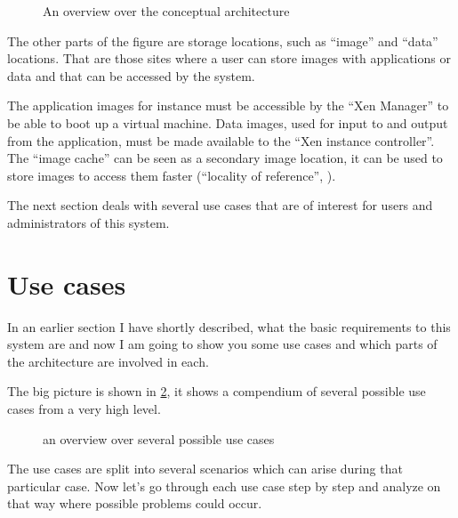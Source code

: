 \begin{figure}[htbp]
  \begin{center}
  \end{center}
  \caption[Architecture overview]{An overview over the conceptual
    architecture}
  \label{fig:architecture}
\end{figure}

The other parts of the figure are storage locations, such as ``image'' and
``data'' locations.   That are those sites  where a user  can store images
with applications  or data  and that  can be accessed  by the  system.

The  application images  for  instance  must be  accessible  by the  ``Xen
Manager'' to be able to boot  up a virtual machine.  Data images, used for
input to  and output from the  application, must be made  available to the
``Xen  instance  controller''.  The  ``image  cache''  can  be seen  as  a
secondary image  location, it can be  used to store images  to access them
faster (``locality of reference'', \cite{locality-principle}).

The next  section deals with  several use cases  that are of  interest for
users and administrators of this system.

\section{Use cases}

In  an  earlier   section  I  have  shortly  described,   what  the  basic
requirements to this  system are and now  I am going to show  you some use
cases and which parts of the architecture are involved in each.

The  big  picture  is  shown  in  \ref{fig:system-usecases},  it  shows  a
compendium of several possible use cases from a very high level.

\begin{figure}[htbp]
  \begin{center}
  \end{center}
  \caption[Use case overview]{an overview over several possible use cases}
  \label{fig:system-usecases}
\end{figure}

The use cases are split into several scenarios which can arise during that
particular  case. Now  let's go  through each  use case  step by  step and
analyze on that way where possible problems could occur.

